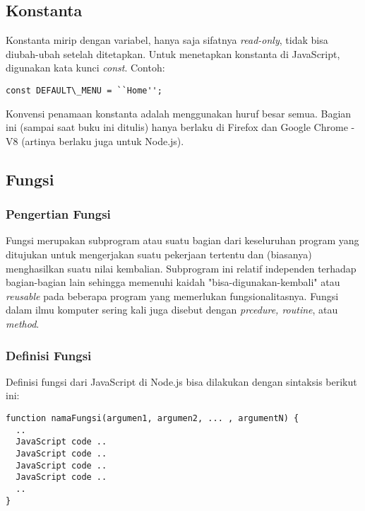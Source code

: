 \subsection{Konstanta}

Konstanta mirip dengan variabel, hanya saja sifatnya \textit{read-only}, tidak bisa diubah-ubah setelah ditetapkan. Untuk menetapkan konstanta di JavaScript, digunakan kata kunci \textit{const}. Contoh: 

\lstset{language=JavaScript,caption=Contoh konstanta dalam JavaScript}
\begin{lstlisting}
const DEFAULT\_MENU = ``Home'';
\end{lstlisting}

Konvensi penamaan konstanta adalah menggunakan huruf besar semua. Bagian ini (sampai saat buku ini ditulis) hanya berlaku di Firefox dan Google Chrome - V8 (artinya berlaku juga untuk Node.js).

\subsection{Fungsi}

\subsubsection{Pengertian Fungsi}

Fungsi merupakan subprogram atau suatu bagian dari keseluruhan program yang ditujukan untuk mengerjakan suatu pekerjaan tertentu dan (biasanya) menghasilkan suatu nilai kembalian. Subprogram ini relatif independen terhadap bagian-bagian lain sehingga memenuhi kaidah "bisa-digunakan-kembali" atau \textit{reusable} pada beberapa program yang memerlukan fungsionalitasnya. Fungsi dalam ilmu komputer sering kali juga disebut dengan \textit{prcedure, routine}, atau \textit{method}.

\subsubsection{Definisi Fungsi}

Definisi fungsi dari JavaScript di Node.js bisa dilakukan dengan sintaksis berikut ini:

\lstset{language=JavaScript,caption=Sintaksis Fungsi dalam JavaScript}
\begin{lstlisting}
function namaFungsi(argumen1, argumen2, ... , argumentN) {
  ..
  JavaScript code ..
  JavaScript code ..
  JavaScript code ..
  JavaScript code ..
  ..
}
\end{lstlisting}

